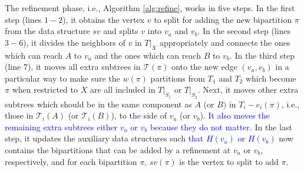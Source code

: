 \documentclass[twocolumn]{bmcart}%
\theoremstyle{mystyle}
\theoremstyle{proofstyle}
\begin{document}
The refinement phase, i.e., Algorithm \ref{alg:refine}, works in five steps. In the first step (lines $1-2$), it obtains the vertex $v$ to split for adding the new bipartition $\pi$ from the data structure $sv$ and splits $v$ into $v_a$ and $v_b$. In the second step (lines $3-6$), it divides the neighbors of $v$ in $T|_X$ appropriately and connects the ones which can reach $A$ to $v_a$ and the ones which can reach $B$ to $v_b$. In the third step (line $7$), it moves all extra subtrees in $\mathcal{T}(\pi)$ onto the new edge $(v_a,v_b)$ in a particular way to make sure the $w(\pi)$ partitions from $T_1$ and $T_2$ which become $\pi$ when restricted to $X$ are all included in $T|_{S_1}$ or $T|_{S_2}$. 
Next, it moves other extra subtrees which should be in the same component as $A$ (or $B)$ in $T_i - e_i(\pi)$, i.e., those in $\mathcal{T}_i(A)$ (or $\mathcal{T}_i(B)$), to the side of $v_a$ (or $v_b$). 
\textcolor{blue}{
It also moves the remaining extra subtrees either $v_a$ or $v_b$ because they do not matter. }
In the last step, it updates the auxiliary data structures such 
\textcolor{blue}{
that $H(v_a)$ or $H(v_b)$} now contains the bipartitions that can be added by a refinement at $v_a$ or $v_b$, respectively, and for each bipartition $\pi$, $sv(\pi)$ is the vertex to split to add $\pi$.
\end{document}
